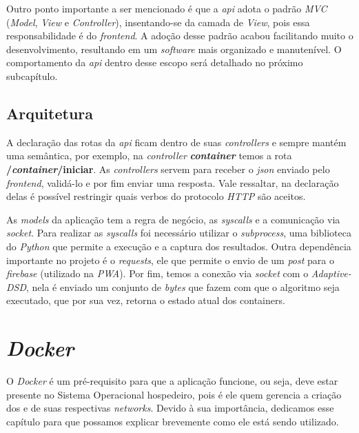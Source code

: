 Outro ponto importante a ser mencionado é que a \textit{api} adota o padrão \textit{MVC} (\textit{Model}, \textit{View} e \textit{Controller}), insentando-se da camada de \textit{View}, pois essa responsabilidade é do \textit{frontend}. A adoção desse padrão acabou facilitando muito o desenvolvimento, resultando em um \textit{software} mais organizado e manutenível. O comportamento da \textit{api} dentro desse escopo será detalhado no próximo subcapítulo.

\subsection{Arquitetura}

A declaração das rotas da \textit{api} ficam dentro de suas \textit{controllers} e sempre mantém uma semântica, por exemplo, na \textit{controller} \textbf{\textit{container}} temos a rota \textbf{/\textit{container}/iniciar}. As \textit{controllers} servem para receber o \textit{json} enviado pelo \textit{frontend}, validá-lo e por fim enviar uma resposta. Vale ressaltar, na declaração delas é possível restringir quais verbos do protocolo \textit{HTTP} são aceitos.

As \textit{models} da aplicação tem a regra de negócio, as \textit{syscalls} e a comunicação via \textit{socket}. Para realizar as \textit{syscalls} foi necessário utilizar o \textit{subprocess}, uma biblioteca do \textit{Python} que permite a execução e a captura dos resultados. Outra dependência importante no projeto é o \textit{requests}, ele que permite o envio de um \textit{post} para o \textit{firebase} (utilizado na \textit{PWA}). Por fim, temos a conexão via \textit{socket} com o \textit{Adaptive-DSD}, nela é enviado um conjunto de \textit{bytes} que fazem com que o algoritmo seja executado, que por sua vez, retorna o estado atual dos containers.



\section{\textit{Docker}}
\label{sec:docker}

O \textit{Docker} é um pré-requisito para que a aplicação funcione, ou seja, deve estar presente no Sistema Operacional hospedeiro, pois é ele quem gerencia a criação dos \containers{} e de suas respectivas \textit{networks}. Devido à sua importância, dedicamos esse capítulo para que possamos explicar brevemente como ele está sendo utilizado.

